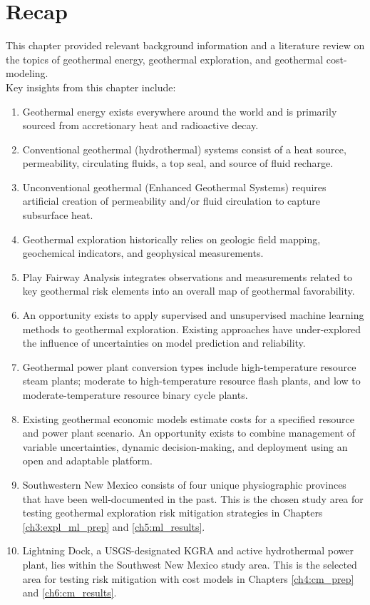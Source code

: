 \section{Recap}\label{ch2:recap}
This chapter provided relevant background information and a literature review on the topics of geothermal energy, geothermal exploration, and geothermal cost-modeling.
\\
Key insights from this chapter include:
\begin{enumerate}
    \item Geothermal energy exists everywhere around the world and is primarily sourced from accretionary heat and radioactive decay.
    \item Conventional geothermal (hydrothermal) systems consist of a heat source, permeability, circulating fluids, a top seal, and source of fluid recharge.
    \item Unconventional geothermal (Enhanced Geothermal Systems) requires artificial creation of permeability and/or fluid circulation to capture subsurface heat.
    \item Geothermal exploration historically relies on geologic field mapping, geochemical indicators, and geophysical measurements.
    \item Play Fairway Analysis integrates observations and measurements related to key geothermal risk elements into an overall map of geothermal favorability.
    \item An opportunity exists to apply supervised and unsupervised machine learning methods to geothermal exploration. Existing approaches have under-explored the influence of uncertainties on model prediction and reliability.
    \item Geothermal power plant conversion types include high-temperature resource steam plants; moderate to high-temperature resource flash plants, and low to moderate-temperature resource binary cycle plants. 
    \item Existing geothermal economic models estimate costs for a specified resource and power plant scenario. An opportunity exists to combine management of variable uncertainties, dynamic decision-making, and deployment using an open and adaptable platform.
    \item Southwestern New Mexico consists of four unique physiographic provinces that have been well-documented in the past. This is the chosen study area for testing geothermal exploration risk mitigation strategies in Chapters \ref{ch3:expl_ml_prep} and \ref{ch5:ml_results}.
    \item Lightning Dock, a USGS-designated KGRA and active hydrothermal power plant, lies within the Southwest New Mexico study area. This is the selected area for testing risk mitigation with cost models in Chapters \ref{ch4:cm_prep} and \ref{ch6:cm_results}.
\end{enumerate}